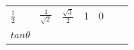 {{\begin{center}
\begin{tabular}[t]{|l|l|l|l|l|l|l|}
    
        
                \begin{math}\frac{1}{2}\end{math}
               &
    
    
        
                \begin{math}\frac{1}{\sqrt{2}}\end{math}
               &
    
    
        
                \begin{math}\frac{\sqrt{3}}{2}\end{math}
               &
    
    
        1 &
    
    
        0%
     \tabularnewline\cline{1-1}\cline{2-2}\cline{3-3}\cline{4-4}\cline{5-5}\cline{6-6}\cline{7-7}
    
    
        
                \begin{math}tan\theta \end{math}
               &
    

\end{tabular}
\end{center}}}
